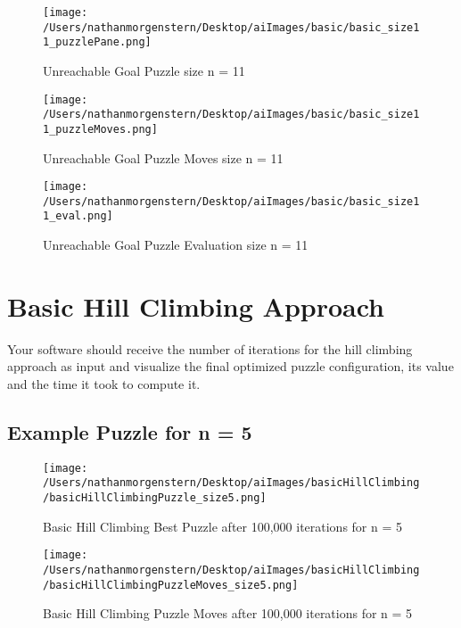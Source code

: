 \documentclass{report}
\begin{document}
	\begin{figure}[H]
	\centering
	\texttt{[image: /Users/nathanmorgenstern/Desktop/aiImages/basic/basic\_size11\_puzzlePane.png]}
	\caption{Unreachable Goal Puzzle size n = 11}
	\label{fig: Basic Evaluation n = 11 unreachable goal puzzle }
	\end{figure}
	
	\begin{figure}[H]
	\centering
	\texttt{[image: /Users/nathanmorgenstern/Desktop/aiImages/basic/basic\_size11\_puzzleMoves.png]}
	\caption{Unreachable Goal Puzzle Moves size n = 11}
	\label{fig: Basic Evaluation n = 11 unreachable goal puzzle moves}
	\end{figure}
	
	\begin{figure}[H]
	\centering
	\texttt{[image: /Users/nathanmorgenstern/Desktop/aiImages/basic/basic\_size11\_eval.png]}
	\caption{Unreachable Goal Puzzle Evaluation size n = 11}
	\label{fig: Basic Evaluation n = 11 unreachable goal puzzle evaluation}
	\end{figure}


\section{Basic Hill Climbing Approach}
Your software should receive the number of iterations for the hill climbing approach as input and visualize the final optimized puzzle configuration, its value and the time it took to compute it.

\subsection{Example Puzzle for n = 5}

	\begin{figure}[H]
	\centering
	\texttt{[image: /Users/nathanmorgenstern/Desktop/aiImages/basicHillClimbing/basicHillClimbingPuzzle\_size5.png]}
	\caption{Basic Hill Climbing Best Puzzle after 100,000 iterations for n = 5} 
	\label{fig: Basic Hill Climbing Best Puzzle after 100,000 iterations for n = 5}
	\end{figure}
	
	\begin{figure}[H]
	\centering
	\texttt{[image: /Users/nathanmorgenstern/Desktop/aiImages/basicHillClimbing/basicHillClimbingPuzzleMoves\_size5.png]}
	\caption{Basic Hill Climbing Puzzle Moves  after 100,000 iterations for n = 5} 
	\label{fig: Basic Hill Climbing Puzzle Moves after 100,000 iterations for n = 5}
	\end{figure}
\end{document}
